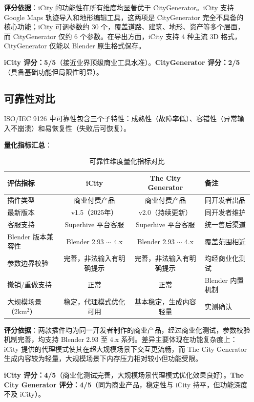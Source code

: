 \documentclass[UTF8,a4paper,10pt]{ctexart}
\begin{document}
\textbf{评分依据}：iCity 的功能性在所有维度均显著优于 CityGenerator。iCity 支持 Google Maps 轨迹导入和地形编辑工具，这两项是 CityGenerator 完全不具备的核心功能；iCity 可调参数约 30 个，覆盖道路、建筑、地形、资产等多个层面，而 CityGenerator 仅约 6 个参数。在导出方面，iCity 支持 4 种主流 3D 格式，CityGenerator 仅能以 Blender 原生格式保存。

\textbf{iCity 评分：5/5}（接近业界顶级商业工具水准）。\textbf{CityGenerator 评分：2/5}（具备基础功能但局限性明显）。

\subsection{可靠性对比}

ISO/IEC 9126 中可靠性包含三个子特性：成熟性（故障率低）、容错性（异常输入不崩溃）和易恢复性（失败后可恢复）。

\textbf{量化指标汇总}：

\begin{table}[htbp]
\centering
\caption{可靠性维度量化指标对比}
\label{tab:reliability_quant}
\begin{tabular}{p{2.5cm}ccX}
\toprule
\textbf{评估指标} & \textbf{iCity} & \textbf{The City Generator} & \textbf{备注} \\
\midrule
插件类型 & 商业付费产品 & 商业付费产品 & 同开发者出品 \\
最新版本 & v1.5（2025年） & v2.0（持续更新） & 同开发者维护 \\
客服支持 & Superhive 平台客服 & Superhive 平台客服 & 统一售后渠道 \\
Blender 版本兼容性 & Blender 2.93 $\sim$ 4.x & Blender 2.93 $\sim$ 4.x & 覆盖范围相近 \\
参数边界校验 & 完善，非法输入有明确提示 & 完善，非法输入有明确提示 & 均经商业化测试 \\
撤销/重做支持 & 正常 & 正常 & Blender 内置机制 \\
大规模场景（2km$^2$） & 稳定，代理模式优化可用 & 基本稳定，生成内容轻量 & 实测确认 \\
\bottomrule
\end{tabular}
\end{table}

\textbf{评分依据}：两款插件均为同一开发者制作的商业产品，经过商业化测试，参数校验机制完善，均支持 Blender 2.93 至 4.x 系列。差异主要体现在功能复杂度上：iCity 提供的代理模式使其在超大规模场景下交互更流畅，而 The City Generator 生成内容较为轻量，大规模场景下内存压力相对较小但功能受限。

\textbf{iCity 评分：4/5}（商业化测试完善，大规模场景代理模式优化效果良好）。\textbf{The City Generator 评分：4/5}（同为商业产品，稳定性与 iCity 持平，但功能深度不及 iCity）。
\end{document}
